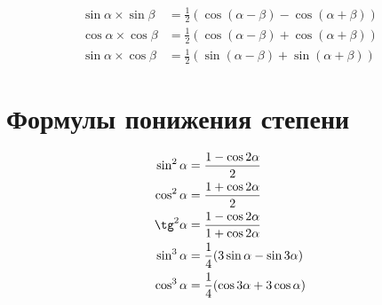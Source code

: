 \documentclass[a4paper,12pt]{article}
\begin{document}
\begin{align*}
\sin\alpha \times \sin\beta &= \frac{1}{2}(\cos(\alpha - \beta) - \cos(\alpha + \beta)) \\
\cos\alpha \times \cos\beta &= \frac{1}{2}(\cos(\alpha - \beta) + \cos(\alpha + \beta)) \\
\sin\alpha \times \cos\beta &= \frac{1}{2}(\sin(\alpha - \beta) + \sin(\alpha + \beta))
\end{align*}

\section{Формулы понижения степени}

\begin{align*}
\sin^2\alpha &= \frac{1 - \cos2\alpha}{2} \\
\cos^2\alpha &= \frac{1 + \cos2\alpha}{2} \\
\tg^2\alpha &= \frac{1 - \cos2\alpha}{1 + \cos2\alpha} \\
\sin^3\alpha &= \frac{1}{4}(3\sin\alpha - \sin3\alpha) \\
\cos^3\alpha &= \frac{1}{4}(\cos3\alpha + 3\cos\alpha)
\end{align*}
\end{document}
